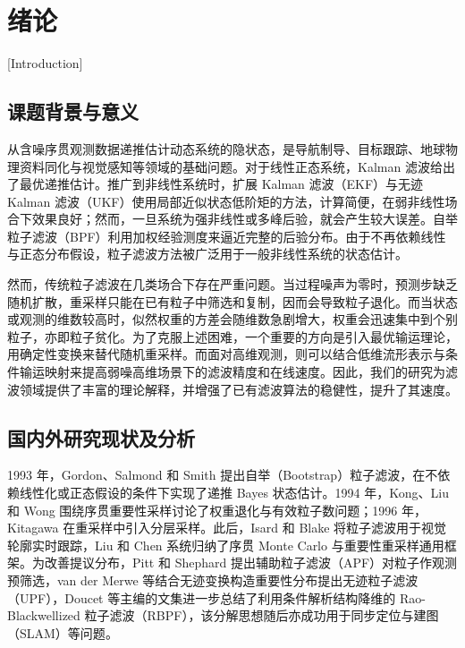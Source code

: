 \chapter{绪论}[Introduction]

\section{课题背景与意义}

从含噪序贯观测数据递推估计动态系统的隐状态，是导航制导、目标跟踪、地球物理资料同化与视觉感知等领域的基础问题\cite{kalman1960new,bar2001estimation,sarkka2013bayesian}。对于线性正态系统，Kalman 滤波给出了最优递推估计\cite{kalman1960new}。推广到非线性系统时，扩展 Kalman 滤波（EKF）与无迹 Kalman 滤波（UKF）\cite{julier1997new}使用局部近似状态低阶矩的方法，计算简便，在弱非线性场合下效果良好；然而，一旦系统为强非线性或多峰后验，就会产生较大误差。自举粒子滤波（BPF）\cite{gordon1993novel}利用加权经验测度来逼近完整的后验分布。由于不再依赖线性与正态分布假设，粒子滤波方法被广泛用于一般非线性系统的状态估计。

然而，传统粒子滤波在几类场合下存在严重问题。当过程噪声为零时，预测步缺乏随机扩散，重采样只能在已有粒子中筛选和复制，因而会导致粒子退化。而当状态或观测的维数较高时，似然权重的方差会随维数急剧增大\cite{bengtsson2008curse,snyder2008obstacles}，权重会迅速集中到个别粒子，亦即粒子贫化。为了克服上述困难，一个重要的方向是引入最优输运理论\cite{villani2009optimal,reich2013nonparametric}，用确定性变换来替代随机重采样。而面对高维观测，则可以结合低维流形表示与条件输运映射来提高弱噪高维场景下的滤波精度和在线速度。因此，我们的研究为滤波领域提供了丰富的理论解释，并增强了已有滤波算法的稳健性，提升了其速度。

\section{国内外研究现状及分析}

1993 年，Gordon、Salmond 和 Smith 提出自举（Bootstrap）粒子滤波，在不依赖线性化或正态假设的条件下实现了递推 Bayes 状态估计\cite{gordon1993novel}。1994 年，Kong、Liu 和 Wong 围绕序贯重要性采样讨论了权重退化与有效粒子数问题\cite{kong1994sequential}；1996 年，Kitagawa 在重采样中引入分层采样\cite{kitagawa1996monte}。此后，Isard 和 Blake 将粒子滤波用于视觉轮廓实时跟踪\cite{isard1998condensation}，Liu 和 Chen 系统归纳了序贯 Monte Carlo 与重要性重采样通用框架\cite{liu1998sequential}。为改善提议分布，Pitt 和 Shephard 提出辅助粒子滤波（APF）对粒子作观测预筛选\cite{pitt1999filtering}，van der Merwe 等结合无迹变换构造重要性分布提出无迹粒子滤波（UPF）\cite{van2000unscented}，Doucet 等主编的文集\cite{doucet2001sequential}进一步总结了利用条件解析结构降维的 Rao-Blackwellized 粒子滤波（RBPF），该分解思想随后亦成功用于同步定位与建图（SLAM）等问题\cite{montemerlo2002fastslam}。

